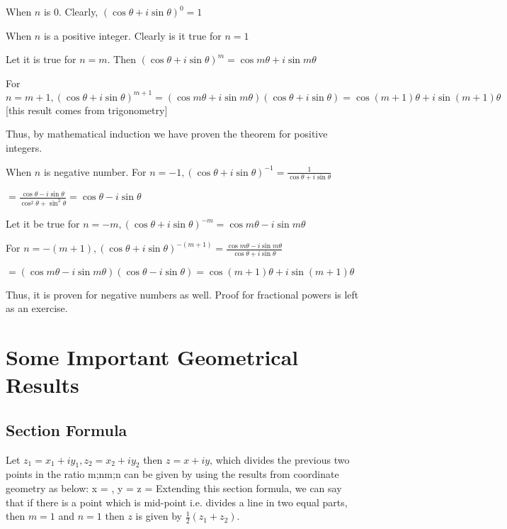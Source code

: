  When $n$ is $0$. Clearly, $(\cos\theta + i\sin\theta)^0 = 1$

 When $n$ is a positive integer. Clearly is it true for $n = 1$

\noindent Let it is true for $n = m$. Then $(\cos\theta + i\sin\theta)^m = \cos m\theta + i\sin m\theta$

\noindent For $n = m + 1, (\cos\theta + i\sin\theta)^{m + 1} = (\cos m\theta + i\sin m\theta)(\cos\theta + i\sin\theta) = \cos(m + 1)\theta +
i\sin(m + 1)\theta$ [this result comes from trigonometry]

\noindent Thus, by mathematical induction we have proven the theorem for positive integers.

 When $n$ is negative number. For $n = -1, (\cos\theta + i\sin\theta)^{-1} = \frac{1}{\cos\theta +
  i\sin\theta}$

\noindent $= \frac{\cos\theta - i\sin\theta}{\cos^2\theta + \sin^2\theta} = \cos\theta - i\sin\theta$

\noindent Let it be true for $n = -m, (\cos\theta + i\sin\theta)^{-m} = \cos m\theta - i\sin m\theta$

\noindent For $n = -(m + 1), (\cos\theta + i\sin\theta)^{-(m + 1)} = \frac{\cos m\theta - i\sin m\theta}{\cos\theta + i\sin\theta}$

\noindent $= (\cos m\theta - i\sin m\theta)(\cos\theta - i\sin\theta) = \cos(m + 1)\theta + i\sin(m + 1)\theta$

Thus, it is proven for negative numbers as well. Proof for fractional powers is left as an exercise.

\section{Some Important Geometrical Results}
\subsection{Section Formula}
Let $z_1 = x_1 + iy_1, z_2 = x_2 + iy_2$ then $z = x + iy$, which divides the previous two points in the ratio m;nm;n can be given
by using the results from coordinate geometry as below:
\startformula x = , y =  \;\;z = \stopformula
Extending this section formula, we can say that if there is a point which is mid-point i.e. divides a line in two equal parts, then
$m = 1$ and $n = 1$ then $z$ is given by $\frac{1}{2}(z_1 + z_2)$.
